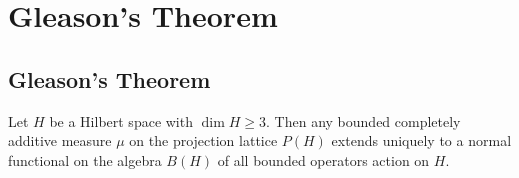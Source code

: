\chapter{Gleason's Theorem}

\section{Gleason's Theorem}

\begin{theorem}
    Let \(H\) be a Hilbert space with \(\dim H \ge 3\). Then any bounded completely additive measure \(\mu\) on the projection lattice \(P(H)\) extends uniquely to a normal functional on the algebra \(B(H)\) of all bounded operators action on \(H\).
\end{theorem}